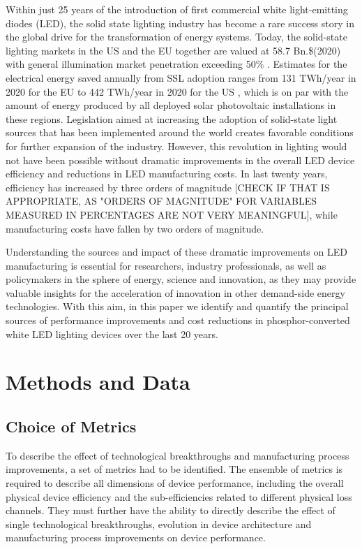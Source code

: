 \documentclass[a4paper,nocompress]{spie}  %
\begin{document}
    Within just 25 years of the introduction of first commercial white light-emitting diodes (LED), the solid state lighting industry has become a rare success story in the global drive for the transformation of energy systems. Today, the solid-state lighting markets in the US and the EU together are valued at 58.7 Bn.\$(2020) \cite{gvr2020market_us,gvr2020market_eu} with general illumination market penetration exceeding 50\% \cite{eu2019impactass,stratunl2018}. Estimates for the electrical energy saved annually from SSL adoption ranges from 131 TWh/year in 2020 for the EU \cite{eu2019impactass} to 442 TWh/year in 2020 for the US \cite{yamada2015adoption,guidehouse2020adoption}, which is on par with the amount of energy produced by all deployed solar photovoltaic installations in these regions. Legislation aimed at increasing the adoption of solid-state light sources that has been implemented around the world creates favorable conditions for further expansion of the industry. However, this revolution in lighting would not have been possible without dramatic improvements in the overall LED device efficiency and reductions in LED manufacturing costs. In last twenty years, efficiency has increased by three orders of magnitude [CHECK IF THAT IS APPROPRIATE, AS "ORDERS OF MAGNITUDE" FOR VARIABLES MEASURED IN PERCENTAGES ARE NOT VERY MEANINGFUL], while manufacturing costs have fallen by two orders of magnitude.

    Understanding the sources and impact of these dramatic improvements on LED manufacturing is essential for researchers, industry professionals, as well as policymakers in the sphere of energy, science and innovation, as they may provide valuable insights for the acceleration of innovation in other demand-side energy technologies. With this aim, in this paper we identify and quantify the principal sources of performance improvements and cost reductions in phosphor-converted white LED lighting devices over the last 20 years. 

\section{Methods and Data}
\label{sec:methods}

\subsection{Choice of Metrics}

    To describe the effect of technological breakthroughs and manufacturing process improvements, a set of metrics had to be identified. The ensemble of metrics is required to describe all dimensions of device performance, including the overall physical device efficiency and the sub-efficiencies related to different physical loss channels. They must further have the ability to directly describe the effect of single technological breakthroughs, evolution in device architecture and manufacturing process improvements on device performance.
    
\end{document}
